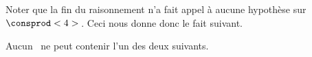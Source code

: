 \smallskip

Noter que la fin du raisonnement n'a fait appel à aucune hypothèse sur $\consprod<4>$\,. Ceci nous donne donc le fait suivant.


\begin{fact} \label{no-sftab-6.1.2.3}
	Aucun \sftab\ ne peut contenir l'un des deux \sftab[x] suivants.
	\begin{center}
	\end{center} 
\end{fact}

